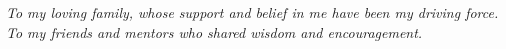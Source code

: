 \documentclass[
	12pt,				%
	openright,			%
	oneside,			%
	a4paper,			%
	english,			%
	brazil				%
	]{unbtex}
\begin{document}


\pretextual

\imprimircapa

\imprimirfolhaderosto*

\fichacatalografica

\imprimirfolhadeaprovacao

\begin{dedicatoria}
   \centering
   \vspace*{\fill}
   
   \textit{To my loving family, whose support and belief in me have been my driving force. \\
   To my friends and mentors who shared wisdom and encouragement.} \\
   
   \vspace*{\fill}
\end{dedicatoria}
\end{document}

